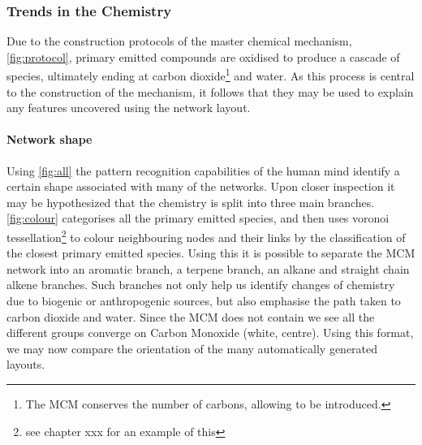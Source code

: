 \subsubsection{Trends in the Chemistry}
Due to the construction protocols of the master chemical mechanism, \autoref{fig:protocol}, primary emitted compounds are oxidised to produce a cascade of species, ultimately ending at carbon dioxide\footnote{The MCM conserves the number of carbons, allowing  to be introduced.} and water. As this process is central to the construction of the mechanism, it follows that they may be used to explain any features uncovered using the network layout. 

\paragraph{Network shape}\label{sec:netshape}
Using \autoref{fig:all} the pattern recognition capabilities of the human mind identify a certain shape associated with many of the networks. Upon closer inspection it may be hypothesized that the chemistry is split into three main branches. \autoref{fig:colour} categorises all the primary emitted species, and then uses voronoi tessellation\footnote{see chapter xxx for an example of this} to colour neighbouring nodes and their links by the classification of the closest primary emitted species. Using this it is possible to separate the MCM network into an aromatic branch, a terpene branch, an alkane and straight chain alkene branches. Such branches not only help us identify changes of chemistry due to biogenic or anthropogenic sources, but also emphasise the path taken to carbon dioxide and water. Since the MCM does not contain  we see all the different groups converge on Carbon Monoxide (white, centre). Using this format, we may now compare the orientation of the many automatically generated layouts.  
 
